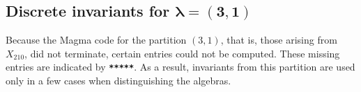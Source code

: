 \documentclass{amsart}
\begin{document}
\clearpage



\pagebreak

\subsection{Discrete invariants for \(\boldsymbol{\lambda = (3,1)}\)}
\noindent

Because the Magma code for the partition \((3,1)\), that is, those arising from \(X_{210}\), did not terminate, certain entries could not be computed. These missing entries are indicated by \textbf{\texttt{*****}}. As a result, invariants from this partition are used only in a few cases when distinguishing the algebras.
\end{document}
